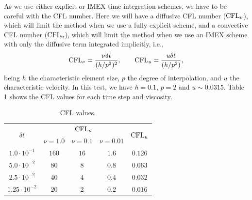 
As we use either explicit or IMEX time integration schemes, we have to be careful with the {CFL} number. Here we will have a diffusive {CFL} number (${\rm CFL}_\nu$), which will limit the method when we use a fully explicit scheme, and a convective {CFL} number (${\rm CFL}_u$), which will limit the method when we use an IMEX scheme with only the diffusive term integrated implicitly, i.e., 
$${\rm CFL}_\nu=\frac{\nu\delta t}{(h/p^2)^2},\quad\quad {\rm CFL}_u =\frac{u\delta t}{(h/p^2)},$$
being $h$ the characteristic element size, $p$ the degree of interpolation, and $u$ the characteristic velocity. In this test, we have $h=0.1$, $p=2$ and $u\sim0.0315$. Table \ref{tab:CFL} shows the {CFL} values for each time step and viscosity. 
\begin{table}[h]
\caption{{CFL} values.}
\label{tab:CFL}
\centering
\begin{tabular}{ccccc}
\toprule
\multirow{2}{*}{$\delta t$}&\multicolumn{3}{c}{${\rm CFL}_\nu$}&\multirow{2}{*}{${\rm CFL}_u$}\\
&$\nu=1.0$&$\nu=0.1$&$\nu=0.01$&\\
\midrule
\midrule
$1.0\cdot10^{-1}$&$160$&$16$&$1.6$&$0.126$\\
$5.0\cdot10^{-2}$&$80$&$8$&$0.8$&$0.063$\\
$2.5\cdot10^{-2}$&$40$&$4$&$0.4$&$0.032$\\
$1.25\cdot10^{-2}$&$20$&$2$&$0.2$& $0.016$\\
\bottomrule
\end{tabular}
\end{table}

